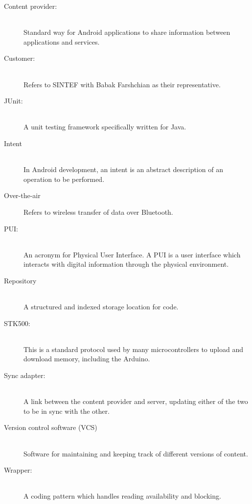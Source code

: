 \begin{description}
	\item[Content provider:]\hfill \\
		Standard way for Android applications to share information between applications and services.
	\item[Customer:]\hfill \\
		Refers to SINTEF with Babak Farshchian as their representative.
	\item[JUnit:]\hfill \\
		A unit testing framework specifically written for Java.
	\item[Intent] \hfill \\
		In Android development, an intent is an abstract description of an operation to be performed.
	\item[Over-the-air]
		Refers to wireless transfer of data over Bluetooth.
	\item[PUI:]\hfill \\
		An acronym for Physical User Interface. A PUI is a user interface which interacts with digital information through the physical environment.
	\item[Repository]\hfill \\
		A structured and indexed storage location for code.
	\item[STK500:]\hfill \\
		This is a standard protocol used by many microcontrollers to upload and download memory, including the Arduino.
	\item[Sync adapter:]\hfill \\
		A link between the content provider and server, updating either of the two to be in sync with the other.
	\item[Version control software (VCS)]\hfill \\
		Software for maintaining and keeping track of different versions of content.
	\item[Wrapper:]\hfill \\
		A coding pattern which handles reading availability and blocking.
\end{description}


